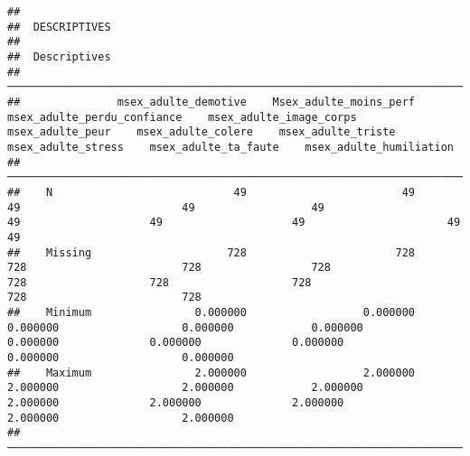 \documentclass[
]{article}
\begin{document}
\begin{verbatim}
## 
##  DESCRIPTIVES
## 
##  Descriptives                                                                                                                                                                                                                                                     
##  ──────────────────────────────────────────────────────────────────────────────────────────────────────────────────────────────────────────────────────────────────────────────────────────────────────────────────────────────────────────────────────────────── 
##               msex_adulte_demotive    Msex_adulte_moins_perf    msex_adulte_perdu_confiance    msex_adulte_image_corps    msex_adulte_peur    msex_adulte_colere    msex_adulte_triste    msex_adulte_stress    msex_adulte_ta_faute    msex_adulte_humiliation   
##  ──────────────────────────────────────────────────────────────────────────────────────────────────────────────────────────────────────────────────────────────────────────────────────────────────────────────────────────────────────────────────────────────── 
##    N                            49                        49                             49                         49                  49                    49                    49                    49                      49                         49   
##    Missing                     728                       728                            728                        728                 728                   728                   728                   728                     728                        728   
##    Minimum                0.000000                  0.000000                       0.000000                   0.000000            0.000000              0.000000              0.000000              0.000000                0.000000                   0.000000   
##    Maximum                2.000000                  2.000000                       2.000000                   2.000000            2.000000              2.000000              2.000000              2.000000                2.000000                   2.000000   
##  ────────────────────────────────────────────────────────────────────────────────────────────────────────────────────────────────────────────────────────────────────────────────────────────────────────────────────────────────────────────────────────────────
\end{verbatim}
\end{document}
